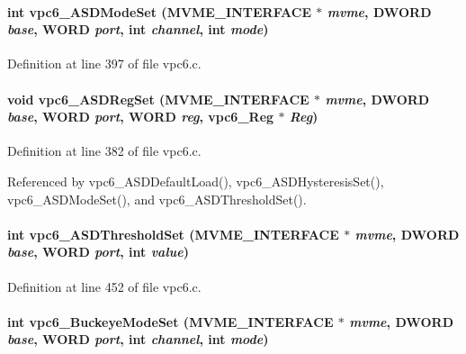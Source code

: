 \paragraph[{vpc6\_\-ASDModeSet}]{\setlength{\rightskip}{0pt plus 5cm}int vpc6\_\-ASDModeSet ({\bf MVME\_\-INTERFACE} $\ast$ {\em mvme}, \/  {\bf DWORD} {\em base}, \/  {\bf WORD} {\em port}, \/  int {\em channel}, \/  int {\em mode})}\hfill\label{vpc6_8c_a4d16aafec8a77a2b1e6427a4fa1b7290}


Definition at line 397 of file vpc6.c.
\paragraph[{vpc6\_\-ASDRegSet}]{\setlength{\rightskip}{0pt plus 5cm}void vpc6\_\-ASDRegSet ({\bf MVME\_\-INTERFACE} $\ast$ {\em mvme}, \/  {\bf DWORD} {\em base}, \/  {\bf WORD} {\em port}, \/  {\bf WORD} {\em reg}, \/  {\bf vpc6\_\-Reg} $\ast$ {\em Reg})}\hfill\label{vpc6_8c_a3288a666b9c619cbb58157a5d9e070d1}


Definition at line 382 of file vpc6.c.

Referenced by vpc6\_\-ASDDefaultLoad(), vpc6\_\-ASDHysteresisSet(), vpc6\_\-ASDModeSet(), and vpc6\_\-ASDThresholdSet().
\paragraph[{vpc6\_\-ASDThresholdSet}]{\setlength{\rightskip}{0pt plus 5cm}int vpc6\_\-ASDThresholdSet ({\bf MVME\_\-INTERFACE} $\ast$ {\em mvme}, \/  {\bf DWORD} {\em base}, \/  {\bf WORD} {\em port}, \/  int {\em value})}\hfill\label{vpc6_8c_a2e598b60509f7c15b802df1ec5ff83ae}


Definition at line 452 of file vpc6.c.
\paragraph[{vpc6\_\-BuckeyeModeSet}]{\setlength{\rightskip}{0pt plus 5cm}int vpc6\_\-BuckeyeModeSet ({\bf MVME\_\-INTERFACE} $\ast$ {\em mvme}, \/  {\bf DWORD} {\em base}, \/  {\bf WORD} {\em port}, \/  int {\em channel}, \/  int {\em mode})}\hfill\label{vpc6_8c_ab1018e72d9d1f8c2401ba5859875a290}



